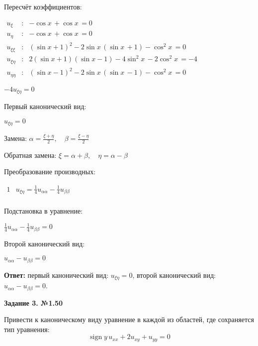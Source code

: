 \documentclass[a4paper,12pt]{article}
\begin{document}
Пересчёт коэффициентов:
\begin{flushleft}
\(
\begin{array}{rcl}
u_{\xi} & : & -\cos x \, + \cos x \, = 0\\
u_{\eta} & : & -\cos x \, + \cos x \, = 0 \\
u_{\xi\xi} & : & (\sin x + 1)^2 - 2 \sin x \, (\sin x \, + 1) - \cos^2 x \, = 0 \\
u_{\xi\eta} & : & 2(\sin x + 1)(\sin x - 1) - 4 \sin^2 x \, - 2 \cos^2 x \,  = -4\\
u_{\eta\eta} & : &  (\sin x - 1)^2 - 2 \sin x \, (\sin x \, - 1) - \cos^2 x \, = 0
\end{array}
\)
\end{flushleft}
\begin{flushleft}
$-4 u_{\xi\eta} = 0$
\end{flushleft}
Первый канонический вид:
\begin{flushleft}
$u_{\xi\eta} = 0$
\end{flushleft}
\begin{flushleft}
Замена:
$\alpha = \frac{\xi + \eta}{2}, \quad \beta = \frac{\xi - \eta}{2}$
\end{flushleft}
\begin{flushleft}
Обратная замена:
$\xi = \alpha + \beta, \quad \eta = \alpha - \beta$
\end{flushleft}
Преобразование производных:
\begin{flushleft}
\(
\begin{array}{r|l}
1 & u_{\xi\eta} = \frac{1}{4} u_{\alpha\alpha} - \frac{1}{4} u_{\beta\beta} \\
\end{array}
\)
\end{flushleft}
Подстановка в уравнение:
\begin{flushleft}
$\frac{1}{4} u_{\alpha\alpha} - \frac{1}{4} u_{\beta\beta}=0$
\end{flushleft}
Второй канонический вид:
\begin{flushleft}
$u_{\alpha\alpha} - u_{\beta\beta}=0$
\end{flushleft}
\textbf{Ответ:} первый канонический вид: $u_{\xi\eta}= 0$, второй канонический вид: $u_{\alpha\alpha} - u_{\beta\beta}=0$.

\begin{center}    
\noindent \textbf{Задание 3. №1.50}
\end{center}

Привести к каноническому виду уравнение в каждой из областей, где сохраняется тип уравнения:
\begin{equation*}
    \operatorname{sign} y \, u_{xx} + 2 u_{xy} + u_{yy} = 0
\end{equation*}
\end{document}
